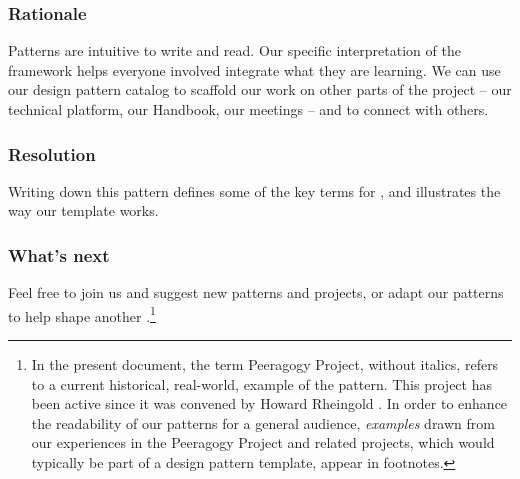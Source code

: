 \subsubsection*{Rationale}
Patterns are intuitive to write and read. Our specific interpretation of the framework helps everyone involved integrate what they are learning.  We can use our design pattern catalog to scaffold our work on other parts of the project -- our technical platform, our Handbook, our meetings -- and to connect with others.  

\subsubsection*{Resolution}  
Writing down this pattern defines some of the key terms for , and illustrates the way our template works. 

\subsubsection*{What's next} 
Feel free to join us and suggest new patterns and projects, or adapt our patterns to help shape another .\footnote{In the present document, the term Peeragogy Project, without italics, refers to a current historical, real-world, example of the  pattern. This project has been active since it was convened by Howard Rheingold \cite{howard-rheingold-lecture}. In order to enhance the readability of our patterns for a general audience, \emph{examples} drawn from our experiences in the Peeragogy Project and related projects, which would typically be part of a design pattern template, appear in footnotes.}
